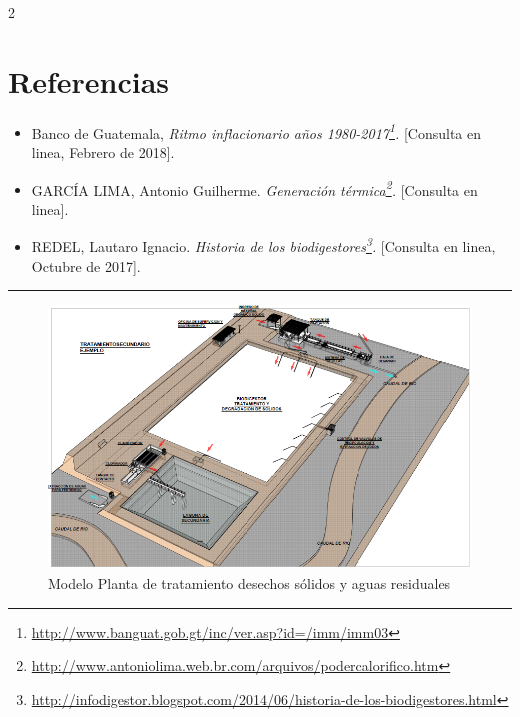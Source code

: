 \documentclass[11pt,spanish,Letterpaper,openany]{book}
\let\rmarkdownfootnote\footnote%
\def\footnote{\protect\rmarkdownfootnote}
\begin{document}
\begin {multicols}{2}
\hypertarget{referencias-1}{%
\section{Referencias}\label{referencias-1}}

\begin{itemize}
\item
  Banco de Guatemala, \emph{Ritmo inflacionario años 1980-2017\footnote{\url{http://www.banguat.gob.gt/inc/ver.asp?id=/imm/imm03}}.} {[}Consulta en linea, Febrero de 2018{]}.
\item
  GARCÍA LIMA, Antonio Guilherme. \emph{Generación térmica\footnote{\url{http://www.antoniolima.web.br.com/arquivos/podercalorifico.htm}}.} {[}Consulta en linea{]}.
\item
  REDEL, Lautaro Ignacio. \emph{Historia de los biodigestores\footnote{\url{http://infodigestor.blogspot.com/2014/06/historia-de-los-biodigestores.html}}.} {[}Consulta en linea, Octubre de 2017{]}.
\end{itemize}

\end {multicols}

\medskip

\begin{center}\rule{0.5\linewidth}{\linethickness}\end{center}

\medskip

\begin{figure}[H]

{\centering \includegraphics[width=1\linewidth]{images/201901-gfong-imagen08} 

}

\caption{Modelo Planta de tratamiento desechos sólidos y aguas residuales}\label{fig:unnamed-chunk-24}
\end{figure}
\end{document}
